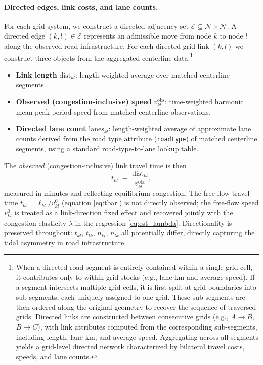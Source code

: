 \documentclass[12pt]{article}
\begin{document}
	\paragraph{Directed edges, link costs, and lane counts.}
	For each grid system, we construct a directed adjacency set $\mathcal E\subseteq\mathcal N\times\mathcal N$. A directed edge $(k,l)\in\mathcal E$ represents an admissible move from node $k$ to node $l$ along the observed road infrastructure. For each directed grid link $(k,l)$ we construct three objects from the aggregated centerline data:\footnote{When a directed road segment is entirely contained within a single grid cell, it contributes only to within-grid stocks (e.g., lane-km and average speed). If a segment intersects multiple grid cells, it is first split at grid boundaries into sub-segments, each uniquely assigned to one grid. These sub-segments are then ordered along the original geometry to recover the sequence of traversed grids. Directed links are constructed between consecutive grids (e.g., $A \to B$, $B \to C$), with link attributes computed from the corresponding sub-segments, including length, lane-km, and average speed. Aggregating across all segments yields a grid-level directed network characterized by bilateral travel costs, speeds, and lane counts.}
	\begin{itemize}
		\item \textbf{Link length} $\text{dist}_{kl}$: length-weighted average over matched centerline segments.
		\item \textbf{Observed (congestion-inclusive) speed} $v_{kl}^{\text{obs}}$: time-weighted harmonic mean peak-period speed from matched centerline observations.
		\item \textbf{Directed lane count} $\text{lanes}_{kl}$: length-weighted average of approximate lane counts derived from the road type attribute (\texttt{roadtype}) of matched centerline segments, using a standard road-type-to-lane lookup table.
	\end{itemize}
	The \emph{observed} (congestion-inclusive) link travel time is then
	\begin{equation}\label{eq:data_tkl}
		t_{kl}\;\equiv\; \frac{\text{dist}_{kl}}{v_{kl}^{\text{obs}}},
	\end{equation}
	measured in minutes and reflecting equilibrium congestion. The free-flow travel time $\bar{t}_{kl}=\ell_{kl}/v^0_{kl}$ (equation \eqref{eq:tbar}) is not directly observed; the free-flow speed $v^0_{kl}$ is treated as a link-direction fixed effect and recovered jointly with the congestion elasticity $\lambda$ in the regression \eqref{eq:est_lambda}. Directionality is preserved throughout: $t_{kl}$, $t_{lk}$, $n_{kl}$, $n_{lk}$ all potentially differ, directly capturing the tidal asymmetry in road infrastructure.
	
\end{document}
